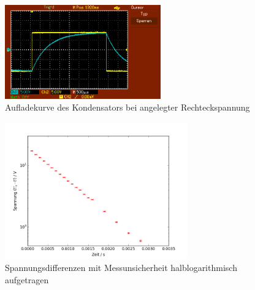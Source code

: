 \begin{figure}[h!]
	\centering
	\includegraphics[width=0.6\textwidth]{aufladekurve.png}
	\caption{Aufladekurve des Kondensators bei angelegter Rechteckspannung}
	\label{fig:aufladekurve}
\end{figure} 
\begin{figure}[h!]
	\centering
	\includegraphics[width=0.7\textwidth]{Spannung1.png}
	\caption{Spannungsdifferenzen mit Messunsicherheit halblogarithmisch aufgetragen}
	\label{fig:spannung1}
\end{figure} 

